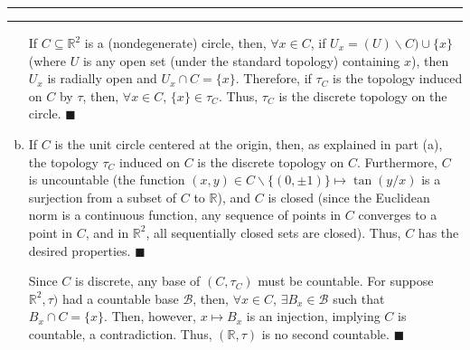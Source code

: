 \documentclass[11pt]{article}
\newcounter{questionCounter}
\newcounter{partCounter}[questionCounter]
\newenvironment{question}[2][\arabic{questionCounter}]{%
    \setcounter{partCounter}{0}%
    \vspace{.25in} \hrule \vspace{0.5em}%
        \noindent{\bf #2}%
    \vspace{0.8em} \hrule \vspace{.10in}%
    \addtocounter{questionCounter}{1}%
}{}
\renewcommand{\qed}{\quad $\blacksquare$}
\newcommand{\sminus}{\backslash}
\newcommand{\R}{\mathbb{R}} %
\begin{document}
\begin{question}{Problem 2}
\begin{enumerate}[(a)]
If $C \subseteq \R^2$ is a (nondegenerate) circle, then, $\forall x \in C$, if
$U_x = (U) \sminus C) \cup \{x\}$ (where $U$ is any open set (under the
standard topology) containing $x$), then $U_x$ is radially open and
$U_x \cap C = \{x\}$. Therefore, if $\tau_C$ is the topology induced on $C$ by
$\tau$, then, $\forall x \in C$, $\{x\} \in \tau_C$. Thus, $\tau_C$ is the
discrete topology on the circle. \qed

\item If $C$ is the unit circle centered at the origin, then, as explained in
part (a), the topology $\tau_C$ induced on $C$ is the discrete topology on
$C$. Furthermore, $C$ is uncountable (the function
$(x,y) \in C\sminus\{(0,\pm 1)\} \mapsto \tan(y/x)$ is a surjection from a
subset of $C$ to $\R$), and $C$ is closed (since the Euclidean norm is a
continuous function, any sequence of points in $C$ converges to a point in
$C$, and in $\R^2$, all sequentially closed sets are closed). Thus, $C$ has
the desired properties. \qed

Since $C$ is discrete, any base of $(C,\tau_C)$ must be countable. For suppose
$\R^2,\tau)$ had a countable base $\mathcal{B}$, then, $\forall x \in C$,
$\exists B_x \in \mathcal{B}$ such that $B_x \cap C = \{x\}$. Then, however,
$x \mapsto B_x$ is an injection, implying $C$ is countable, a contradiction.
Thus, $(\R,\tau)$ is no second countable. \qed
\end{enumerate}
\end{question}
\end{document}
